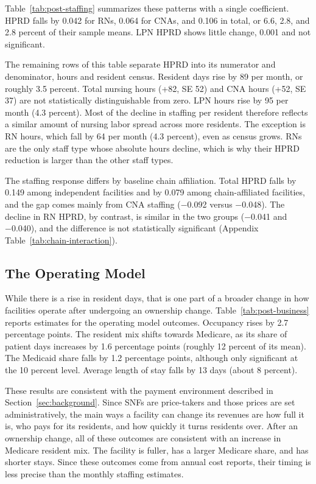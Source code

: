 \documentclass[12pt]{article}
\begin{document}
Table~\ref{tab:post-staffing} summarizes these patterns with a single coefficient. HPRD falls by 0.042 for RNs, 0.064 for CNAs, and 0.106 in total, or 6.6, 2.8, and 2.8 percent of their sample means. LPN HPRD shows little change, 0.001 and not significant.

The remaining rows of this table separate HPRD into its numerator and denominator, hours and resident census. Resident days rise by 89 per month, or roughly 3.5 percent. Total nursing hours (+82, SE 52) and CNA hours (+52, SE 37) are not statistically distinguishable from zero. LPN hours rise by 95 per month (4.3 percent). Most of the decline in staffing per resident therefore reflects a similar amount of nursing labor spread across more residents. The exception is RN hours, which fall by 64 per month (4.3 percent), even as census grows. RNs are the only staff type whose absolute hours decline, which is why their HPRD reduction is larger than the other staff types.

The staffing response differs by baseline chain affiliation. Total HPRD falls by 0.149 among independent facilities and by 0.079 among chain-affiliated facilities, and the gap comes mainly from CNA staffing (−0.092 versus −0.048). The decline in RN HPRD, by contrast, is similar in the two groups (−0.041 and −0.040), and the difference is not statistically significant (Appendix Table~\ref{tab:chain-interaction}).


\FloatBarrier

\subsection{The Operating Model}

While there is a rise in resident days, that is one part of a broader change in how facilities operate after undergoing an ownership change. Table~\ref{tab:post-business} reports estimates for the operating model outcomes. Occupancy rises by 2.7 percentage points. The resident mix shifts towards Medicare, as its share of patient days increases by 1.6 percentage points (roughly 12 percent of its mean). The Medicaid share falls by 1.2 percentage points, although only significant at the 10 percent level. Average length of stay falls by 13 days (about 8 percent).

These results are consistent with the payment environment described in Section~\ref{sec:background}. Since SNFs are price-takers and those prices are set administratively, the main ways a facility can change its revenues are how full it is, who pays for its residents, and how quickly it turns residents over. After an ownership change, all of these outcomes are consistent with an increase in Medicare resident mix. The facility is fuller, has a larger Medicare share, and has shorter stays. Since these outcomes come from annual cost reports, their timing is less precise than the monthly staffing estimates. 
\end{document}
